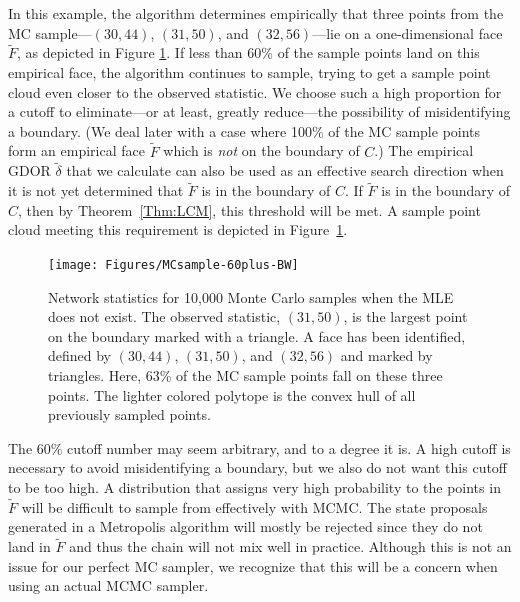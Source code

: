 In this example, the algorithm determines empirically that three points 
from the MC sample---$(30,44)$, $(31,50)$, and $(32,56)$---lie on a 
one-dimensional face $\tilde{F}$, as depicted in Figure \ref{F:MC face}.  
If less than 60\% of the sample points land on this empirical face, the 
algorithm continues to sample, trying to get a sample point cloud even closer to the 
observed statistic.  We choose such a high proportion for a cutoff to eliminate---or 
at least, greatly reduce---the possibility of misidentifying a boundary.
(We deal later with a case where 100\% of the MC sample points form an empirical face $\tilde{F}$ which is 
\emph{not} on the boundary of $C$.)  The empirical GDOR $\tilde{\delta}$ that we calculate 
can also be used as an effective search direction when it is not yet determined that 
$\tilde{F}$ is in the boundary of $C$.  If $\tilde{F}$ is in the boundary of $C$, then 
by Theorem~\ref{Thm:LCM}, this threshold will be met.  A sample point cloud meeting this requirement 
is depicted in Figure~\ref{F:MC face}. 

\begin{figure}[h!]
\centering
\texttt{[image: Figures/MCsample-60plus-BW]} %
\caption[Network statistics for 10,000 Monte Carlo samples when MLE does not exist]
{Network statistics for 10,000 Monte Carlo samples when the MLE does not exist.  
The observed statistic, $(31,50)$, is the largest point on the boundary marked with a triangle.
A face has been identified,
defined by $(30,44)$, $(31,50)$, and $(32,56)$ and marked 
by triangles.  
Here, 63\% of the MC sample points fall on these three points.
The lighter colored polytope is the convex hull of all previously 
sampled points.%
}
\label{F:MC face}
\end{figure}

The 60\% cutoff number may seem arbitrary, and to a degree it is.  A high cutoff
is necessary to avoid misidentifying a boundary, but we also do not want this cutoff to be too high.
A distribution that assigns very high probability to the points in $\tilde{F}$ 
will be difficult to sample from effectively with MCMC.  The state proposals
generated in a Metropolis algorithm
will mostly be rejected since they do not land in $\tilde{F}$ and thus the chain will
not mix well in practice.  Although this is not an issue for our perfect MC sampler,
we recognize that this will be a concern when using an actual MCMC sampler.

